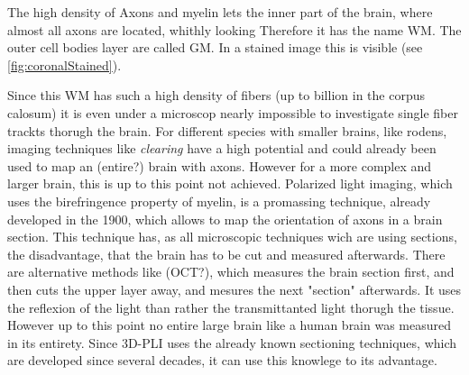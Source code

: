 The high density of Axons and myelin lets the inner part of the brain, where almost all axons are located, whithly looking
Therefore it has the name \ac{WM}.
The outer cell bodies layer are called \ac{GM}.
In a stained image this is visible (see \cref{fig:coronalStained}).
\par
Since this \ac{WM} has such a high density of fibers (up to billion in the corpus calosum) it is even under a microscop nearly impossible to investigate single fiber trackts thorugh the brain.
For different species with smaller brains, like rodens, imaging techniques like \textit{clearing} have a high potential and could already been used to map an (entire?) brain with axons.
However for a more complex and larger brain, this is up to this point not achieved.
Polarized light imaging, which uses the birefringence property of myelin, is a promassing technique, already developed in the 1900, which allows to map the orientation of axons in a brain section.
This technique has, as all microscopic techniques wich are using sections, the disadvantage, that the brain has to be cut and measured afterwards.
There are alternative methods like (OCT?), which measures the brain section first, and then cuts the upper layer away, and mesures the next "section" afterwards. It uses the reflexion of the light than rather the transmittanted light thorugh the tissue.
However up to this point no entire large brain like a human brain was measured in its entirety.
Since \ac{3D-PLI} uses the already known sectioning techniques, which are developed since several decades, it can use this knowlege to its advantage.
% 
%
